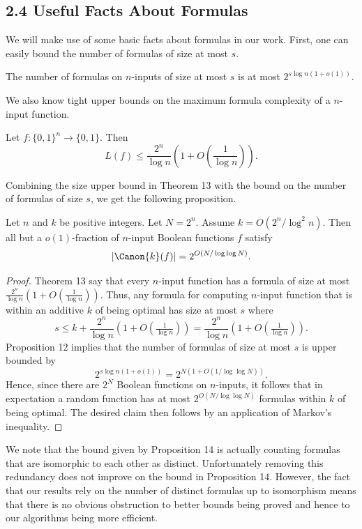 \subsection*{2.4 Useful Facts About Formulas}
We will make use of some basic facts about formulas in our work. First, one can easily bound the number of formulas of size at most $s$.
\begin{ntproposition}
The number of formulas on $n$-inputs of size at most $s$ is at most $2^{s\log n(1+o(1))}$.
\end{ntproposition}
We also know tight upper bounds on the maximum formula complexity of a $n$-input function.
\begin{nttheorem}
Let $f:\{0,1\}^n\to\{0,1\}$. Then
\[L(f)\leq\frac{2^n}{\log n}\left(1+O\left(\frac 1{\log n}\right)\right).\]
\end{nttheorem}
Combining the size upper bound in Theorem 13 with the bound on the number of formulas of size $s$, we get the following proposition.
\begin{ntproposition}
Let $n$ and $k$ be positive integers. Let $N=2^n$. Assume $k=O(2^n/\log^2n)$. Then all but a $o(1)$-fraction of $n$-input Boolean functions $f$ satisfy
\[|\Canon{k}(f)|=2^{O(N/\log\log N)}.\]
\end{ntproposition}
\begin{proof}
Theorem 13 say that every $n$-input function has a formula of size at most $\frac{2^n}{\log n}(1+O(\frac 1{\log n}))$. Thus, any formula for computing $n$-input function that is within an additive $k$ of being optimal has size at most $s$ where
\[s\leq k+\frac{2^n}{\log n}(1+O(\tfrac 1{\log n}))=\frac{2^n}{\log n}(1+O(\tfrac 1{\log n})).\]
Proposition 12 implies that the number of formulas of size at most $s$ is upper bounded by
\[2^{s\log n(1+o(1))}=2^{N(1+O(1/\log\log N))}.\]
Hence, since there are $2^N$ Boolean functions on $n$-inputs, it follows that in expectation a random function has at most $2^{O(N/\log\log N)}$ formulas within $k$ of being optimal. The desired claim then follows by an application of Markov's inequality.
\end{proof}
We note that the bound given by Proposition 14 is actually counting formulas that are isomorphic to each other as distinct. Unfortunately removing this redundancy does not improve on the bound in Proposition 14. However, the fact that our results rely on the number of distinct formulas up to isomorphism means that there is no obvious obstruction to better bounds being proved and hence to our algorithms being more efficient.
